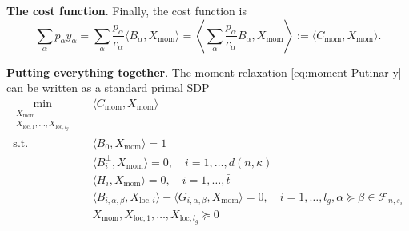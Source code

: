 \documentclass[
]{book}
\theoremstyle{definition}
\theoremstyle{definition}
\theoremstyle{definition}
\theoremstyle{definition}
\theoremstyle{remark}
\begin{document}
\textbf{The cost function}. Finally, the cost function is
\[
\sum_{\alpha} p_{\alpha} y_{\alpha} = \sum_{\alpha} \frac{p_{\alpha}}{c_{\alpha}} \langle B_{\alpha}, X_{\mathrm{mom}} \rangle = \left\langle \sum_{\alpha} \frac{p_{\alpha}}{c_{\alpha}} B_{\alpha} , X_{\mathrm{mom}} \right\rangle := \langle C_{\mathrm{mom}}, X_{\mathrm{mom}} \rangle.
\]

\textbf{Putting everything together}. The moment relaxation \eqref{eq:moment-Putinar-y} can be written as a standard primal SDP
\begin{equation}
\begin{split}
\min_{\substack{X_{\mathrm{mom}} \\ X_{\mathrm{loc},1},\dots,X_{\mathrm{loc},l_g}} } & \quad \langle C_{\mathrm{mom}}, X_{\mathrm{mom}} \rangle \\
\mathrm{s.t.}& \quad \langle B_0, X_{\mathrm{mom}} \rangle = 1 \\
& \quad \langle B_i^{\perp}, X_{\mathrm{mom}} \rangle = 0, \quad i=1,\dots,d(n,\kappa) \\
& \quad \langle H_i, X_{\mathrm{mom}} \rangle = 0, \quad i=1,\dots,\bar{t} \\
& \quad \langle B_{i,\alpha,\beta}, X_{\mathrm{loc},i} \rangle - \langle G_{i,\alpha,\beta}, X_{\mathrm{mom}} \rangle = 0, \quad i=1,\dots,l_g, \alpha\succeq\beta \in \mathcal{F}_{n,s_i} \\
& \quad X_{\mathrm{mom}},X_{\mathrm{loc},1},\dots,X_{\mathrm{loc},l_g} \succeq 0
\end{split}
\label{eq:moment-Putinar-standard-primal-SDP}
\end{equation}

  
\end{document}
